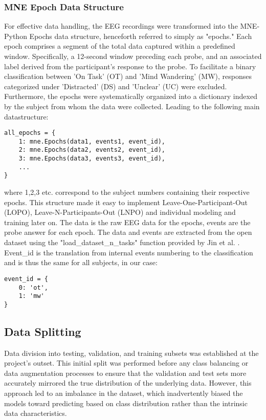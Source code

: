 \subsubsection{MNE Epoch Data Structure}
For effective data handling, the EEG recordings were transformed into the MNE-Python Epochs data structure, henceforth referred to simply as "epochs." Each epoch comprises a segment of the total data captured within a predefined window. Specifically, a 12-second window preceding each probe, and an associated label derived from the participant's response to the probe. To facilitate a binary classification between 'On Task' (OT) and 'Mind Wandering' (MW), responses categorized under 'Distracted' (DS) and 'Unclear' (UC) were excluded. Furthermore, the epochs were systematically organized into a dictionary indexed by the subject from whom the data were collected. Leading to the following main datastructure:

\begin{verbatim}
all_epochs = {
    1: mne.Epochs(data1, events1, event_id),
    2: mne.Epochs(data2, events2, event_id),
    3: mne.Epochs(data3, events3, event_id),
    ...
}
\end{verbatim}

where 1,2,3 etc. correspond to the subject numbers containing their respective epochs. This structure made it easy to implement Leave-One-Participant-Out (LOPO), Leave-N-Participants-Out (LNPO) and individual modeling and training later on. The data is the raw EEG data for the epochs, events are the probe answer for each epoch. The data and events are extracted from the open dataset using the "load\_dataset\_n\_tasks" function provided by Jin et al. \cite{Jin2019PredictingMW}. Event\_id is the translation from internal events numbering to the classification and is thus the same for all subjects, in our case:

\begin{verbatim}
event_id = {
    0: 'ot',
    1: 'mw'
}
\end{verbatim}

\subsection{Data Splitting}
Data division into testing, validation, and training subsets was established at the project's outset. This initial split was performed before any class balancing or data augmentation processes to ensure that the validation and test sets more accurately mirrored the true distribution of the underlying data. However, this approach led to an imbalance in the dataset, which inadvertently biased the models toward predicting based on class distribution rather than the intrinsic data characteristics.

